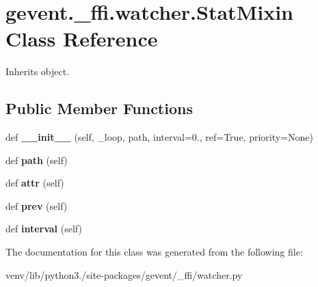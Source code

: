 \hypertarget{classgevent_1_1__ffi_1_1watcher_1_1_stat_mixin}{}\section{gevent.\+\_\+ffi.\+watcher.\+Stat\+Mixin Class Reference}
\label{classgevent_1_1__ffi_1_1watcher_1_1_stat_mixin}


Inherits object.

\subsection*{Public Member Functions}
\begin{DoxyCompactItemize}
\item 
\mbox{\label{classgevent_1_1__ffi_1_1watcher_1_1_stat_mixin_a47d5fed95570907547f0e9a8fef05dc2}} 
def {\bfseries \+\_\+\+\_\+init\+\_\+\+\_\+} (self, \+\_\+loop, path, interval=0., ref=True, priority=None)
\item 
\mbox{\label{classgevent_1_1__ffi_1_1watcher_1_1_stat_mixin_a8b93a2f0c9ca9b98cbe382fa08e25973}} 
def {\bfseries path} (self)
\item 
\mbox{\label{classgevent_1_1__ffi_1_1watcher_1_1_stat_mixin_a023a83c111e82da255172b242c93df50}} 
def {\bfseries attr} (self)
\item 
\mbox{\label{classgevent_1_1__ffi_1_1watcher_1_1_stat_mixin_a41820930a9b05fde50c020f283f74501}} 
def {\bfseries prev} (self)
\item 
\mbox{\label{classgevent_1_1__ffi_1_1watcher_1_1_stat_mixin_a3af84c20a314f7f25ef5bcd6667c5a8f}} 
def {\bfseries interval} (self)
\end{DoxyCompactItemize}


The documentation for this class was generated from the following file\+:\begin{DoxyCompactItemize}
\item 
venv/lib/python3./site-\/packages/gevent/\+\_\+ffi/watcher.\+py\end{DoxyCompactItemize}
